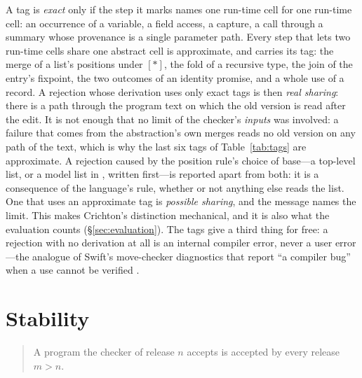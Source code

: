A tag is \emph{exact} only if the step it marks names one run-time cell for one run-time cell: an
occurrence of a variable, a field access, a capture, a call through a summary whose provenance is a single
parameter path. Every step that lets two run-time cells share one abstract cell is approximate, and carries
its tag: the merge of a list's positions under $[\ast]$, the fold of a recursive type, the join of the
entry's fixpoint, the two outcomes of an identity promise, and a whole use of a record. A rejection whose
derivation uses only exact tags is then \emph{real sharing}: there is a path through the program text on
which the old version is read after the edit. It is not enough that no limit of the checker's
\emph{inputs} was involved: a failure that comes from the abstraction's own merges reads no old version on
any path of the text, which is why the last six tags of Table~\ref{tab:tags} are approximate. A rejection caused by the position rule's choice of base---a
top-level list, or a model list in , written first---is reported apart from both: it is a
consequence of the language's rule, whether or not anything else reads the list. One that uses an
approximate tag is \emph{possible sharing}, and the message names the limit. This makes Crichton's
distinction mechanical, and it is also what the evaluation counts (\S\ref{sec:evaluation}). The tags give
a third thing for free: a rejection with no derivation at all is an internal compiler error, never a user
error---the analogue of Swift's move-checker diagnostics that report ``a compiler bug'' when a use cannot
be verified \citep{swift2026diagnosticssil}.

\section{Stability}
\label{sec:errors-stability}

\begin{quote}
A program the checker of release $n$ accepts is accepted by every release $m > n$.
\end{quote}


